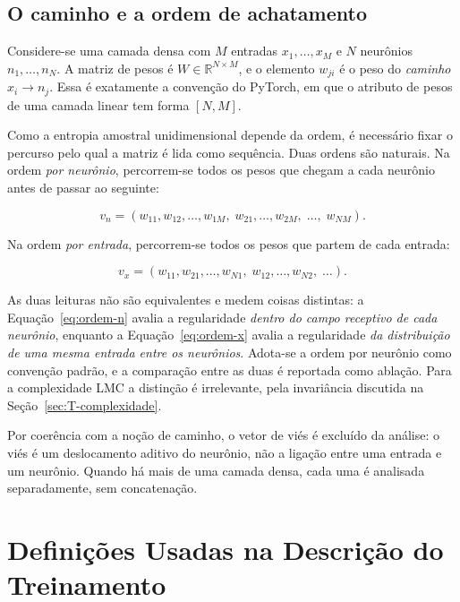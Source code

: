 \subsection{O caminho e a ordem de achatamento}

Considere-se uma camada densa com $M$ entradas $x_1, \dots, x_M$ e $N$ neurônios
$n_1, \dots, n_N$. A matriz de pesos é $W \in \mathbb{R}^{N \times M}$, e o
elemento $w_{ji}$ é o peso do \emph{caminho} $x_i \rightarrow n_j$. Essa é
exatamente a convenção do PyTorch, em que o atributo de pesos de uma camada
linear tem forma $[N, M]$.

Como a entropia amostral unidimensional depende da ordem, é necessário fixar o
percurso pelo qual a matriz é lida como sequência. Duas ordens são naturais.
Na ordem \emph{por neurônio}, percorrem-se todos os pesos que chegam a cada
neurônio antes de passar ao seguinte:

\begin{equation}
    v_{n} = (w_{11}, w_{12}, \dots, w_{1M},\; w_{21}, \dots, w_{2M},\; \dots,\; w_{NM}).
    \label{eq:ordem-n}
\end{equation}

Na ordem \emph{por entrada}, percorrem-se todos os pesos que partem de cada
entrada:

\begin{equation}
    v_{x} = (w_{11}, w_{21}, \dots, w_{N1},\; w_{12}, \dots, w_{N2},\; \dots).
    \label{eq:ordem-x}
\end{equation}

As duas leituras não são equivalentes e medem coisas distintas: a
Equação~\ref{eq:ordem-n} avalia a regularidade \emph{dentro do campo receptivo
de cada neurônio}, enquanto a Equação~\ref{eq:ordem-x} avalia a regularidade
\emph{da distribuição de uma mesma entrada entre os neurônios}. Adota-se a
ordem por neurônio como convenção padrão, e a comparação entre as duas é
reportada como ablação. Para a complexidade LMC a distinção é irrelevante, pela
invariância discutida na Seção~\ref{sec:T-complexidade}.

Por coerência com a noção de caminho, o vetor de viés é excluído da análise: o
viés é um deslocamento aditivo do neurônio, não a ligação entre uma entrada e
um neurônio. Quando há mais de uma camada densa, cada uma é analisada
separadamente, sem concatenação.

\section{Definições Usadas na Descrição do Treinamento}
\label{sec:T-overfitting}

